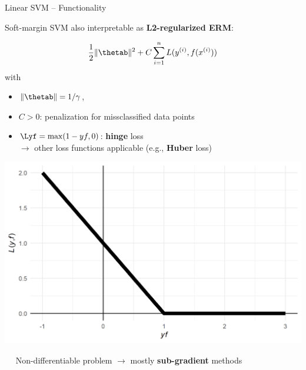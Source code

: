 \begin{vbframe}{Linear SVM -- Functionality}
\framebreak


Soft-margin SVM also interpretable as \textbf{L2-regularized ERM}: 

\begin{minipage}[c]{0.58\textwidth}
  $$ \frac{1}{2} \|\thetab\|^2 + C \sumin \Lxyi$$ 
  with  
  \begin{itemize}
    \item $\|\thetab\| = 1 / \gamma$,\\
    \item $C > 0$: penalization for missclassified data points
    \item $\Lyf = \max(1-yf, 0)$: \textbf{hinge} loss \\
    $\rightarrow$ other loss functions applicable (e.g., \textbf{Huber} loss)
  \end{itemize}
\end{minipage}
\begin{minipage}[c]{0.4\textwidth}
  \centering
  \includegraphics[height=0.4\textwidth, keepaspectratio=true]{
  figure/plot-hinge-loss.png}
\end{minipage}


%     


\vspace{1cm}

 ~~
Non-differentiable problem $\rightarrow$ mostly \textbf{sub-gradient} 
methods 


\end{vbframe}
